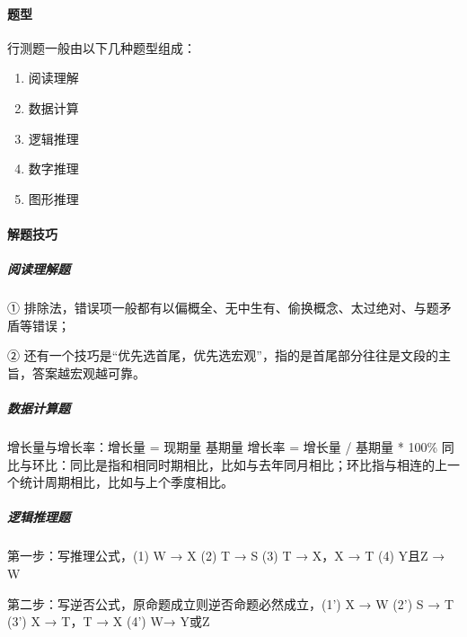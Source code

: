 \documentclass[letterpaper,11pt,english]{sphinxmanual}
\begin{document}
\paragraph{题型}
\label{\detokenize{chapter_interview/exam:id2}}
行测题一般由以下几种题型组成：%
\begin{footnote}[767]\sphinxAtStartFootnote
{}
%
\end{footnote}
\begin{enumerate}
%
\item {} 
阅读理解

\item {} 
数据计算

\item {} 
逻辑推理

\item {} 
数字推理

\item {} 
图形推理

\end{enumerate}


\paragraph{解题技巧}
\label{\detokenize{chapter_interview/exam:id3}}

\subparagraph{阅读理解题}
\label{\detokenize{chapter_interview/exam:id4}}
①
排除法，错误项一般都有以偏概全、无中生有、偷换概念、太过绝对、与题矛盾等错误；

②
还有一个技巧是“优先选首尾，优先选宏观”，指的是首尾部分往往是文段的主旨，答案越宏观越可靠。


\subparagraph{数据计算题}
\label{\detokenize{chapter_interview/exam:id5}}
增长量与增长率：增长量 = 现期量 \sphinxhyphen{} 基期量 增长率 = 增长量 / 基期量 *
100\%
同比与环比：同比是指和相同时期相比，比如与去年同月相比；环比指与相连的上一个统计周期相比，比如与上个季度相比。


\subparagraph{逻辑推理题}
\label{\detokenize{chapter_interview/exam:id6}}
第一步：写推理公式，(1) W → X (2) \sphinxhyphen{}T → \sphinxhyphen{}S (3) T → \sphinxhyphen{}X，X → \sphinxhyphen{}T (4) Y且Z →
W

第二步：写逆否公式，原命题成立则逆否命题必然成立，(1’) \sphinxhyphen{}X → \sphinxhyphen{}W (2’) S →
T (3’) X → \sphinxhyphen{}T，T → \sphinxhyphen{}X (4’) \sphinxhyphen{}W→ \sphinxhyphen{}Y或\sphinxhyphen{}Z
\end{document}
